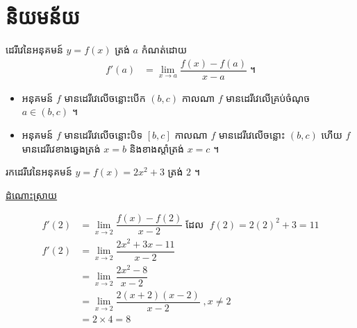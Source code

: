 \documentclass[12pt,fleqn]{book} %
\newcommand{\answer}{\begin{center}
\kml \color{blue} \underline{ដំណោះស្រាយ}
\end{center}}
\begin{document}
\section{និយមន័យ}
\begin{definition}
ដេរីវេនៃអនុគមន៍ $y=f(x)$ ត្រង់ $a$ កំណត់ដោយ 
\begin{align}\label{def1}
 f'(a)&=\lim _{x\to a}\dfrac{f(x)-f(a)}{x-a} \;\text{។}
 \end{align}
  \end{definition}
\begin{itemize}
\item អនុគមន៍ $f$ មានដេរីវេលើចន្លោះបើក $(b,c)$ កាលណា $f$ មានដេរីវេលើគ្រប់ចំណុច
 $a\in (b,c)$ ។
\item អនុគមន៍ $f$ មានដេរីវេលើចន្លោះបិទ $[b,c]$ កាលណា $f$ មានដេរីវេលើចន្លោះ $(b,c)$ ហើយ $f$
 មានដេរីវេខាងឆ្វេងត្រង់ $x=b$ និងខាងស្តាំត្រង់ $x=c$ ។ 
 \end{itemize}
\begin{example}
រកដេរីវេនៃអនុគមន៍ $y=f(x)=2x^2+3$ ត្រង់ $2$ ។
\end{example}
\answer
\begin{align*}
f'(2)&=\lim_{x\to 2}\dfrac{f(x)-f(2)}{x-2}\; \text{ដែល } \; f(2)=2(2)^2+3=11\\
f'(2)&=\lim_{x\to 2}\dfrac{2x^2+3x-11}{x-2}\\
&=\lim_{x\to 2}\dfrac{2x^2-8}{x-2}\\
&=\lim_{x\to 2}\dfrac{2(x+2)(x-2)}{x-2}\; ,x\neq 2\\
&=2\times 4=8
\end{align*}
\end{document}
